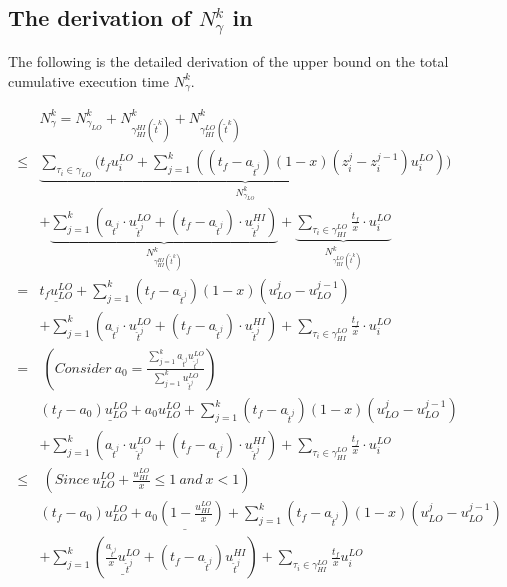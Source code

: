 \documentclass[10pt,journal,compsoc]{IEEEtran}
\begin{document}
\begin{appendices}
\section{The derivation of $N^{k}_{\gamma}$ in }
\label{appendix:I}
The following is the detailed derivation of the upper bound on the total cumulative execution time $N^{k}_{\gamma}$.
\begingroup
\allowdisplaybreaks
\begin{scriptsize}
\begin{align}
&N^{k}_{\gamma}=N^{k}_{\gamma_{LO}}+N^{k}_{\gamma_{HI}^{HI}(\hat{t}^{k})}+N^{k}_{\gamma_{HI}^{LO}(\hat{t}^{k})} \nonumber \\
\le{}&\underbrace{\sum_{\tau_i\in\gamma_{LO}}\bigg(t_fu_i^{LO}+\sum_{j=1}^{k}{((t_f-a_{\hat{t}^{j}})(1-x)(z_i^{j}-z_i^{j-1})u_i^{LO})}\bigg)}_{N^{k}_{\gamma_{LO}}}  \nonumber \\
&+\underbrace{\sum_{j=1}^{k}{(a_{\hat{t}^j}\cdot{}u_{\hat{t}^j}^{LO}+(t_f-a_{\hat{t}^j})\cdot{}u_{\hat{t}^j}^{HI})}}_{N^{k}_{\gamma_{HI}^{HI}(\hat{t}^{k})}} 
+\underbrace{\sum_{\tau_i\in\gamma_{HI}^{LO}}{\frac{t_f}{x}\cdot{}u_{i}^{LO}}}_{N^{k}_{\gamma_{HI}^{LO}(\hat{t}^{k})}} \nonumber \\
=&\underline{t_fu_{LO}^{LO}}+\sum_{j=1}^{k}{(t_f-a_{\hat{t}^{j}})(1-x)(u_{LO}^{j}-u_{LO}^{j-1})}\nonumber \\
&+\sum_{j=1}^{k}{(a_{\hat{t}^j}\cdot{}u_{\hat{t}^j}^{LO}+(t_f-a_{\hat{t}^j})\cdot{}u_{\hat{t}^j}^{HI})} 
+\sum_{\tau_i\in\gamma_{HI}^{LO}}{\frac{t_f}{x}\cdot{}u_{i}^{LO}} \nonumber \\
=&\ (Consider\ a_0=\frac{\sum_{j=1}^{k}{a_{\hat{t}^{j}}u_{\hat{t}^j}^{LO}}}{\sum_{j=1}^{k}{u_{\hat{t}^j}^{LO}}})   \nonumber \\
&\underline{(t_f-a_0)u_{LO}^{LO}+a_0u_{LO}^{LO}}+\sum_{j=1}^{k}{(t_f-a_{\hat{t}^{j}})(1-x)(u_{LO}^{j}-u_{LO}^{j-1})}\nonumber \\
&+\sum_{j=1}^{k}{(a_{\hat{t}^j}\cdot{}u_{\hat{t}^j}^{LO}+(t_f-a_{\hat{t}^j})\cdot{}u_{\hat{t}^j}^{HI})} 
+\sum_{\tau_i\in\gamma_{HI}^{LO}}{\frac{t_f}{x}\cdot{}u_{i}^{LO}} \nonumber \\
\le&\ (Since\ u_{LO}^{LO}+\frac{u_{HI}^{LO}}{x}\le{1}\ and\ x<1) \nonumber \\
&(t_f-a_0)u_{LO}^{LO}+\underline{a_0(1-\frac{u_{HI}^{LO}}{x})}+\sum_{j=1}^{k}{(t_f-a_{\hat{t}^{j}})(1-x)(u_{LO}^{j}-u_{LO}^{j-1})}\nonumber \\
&+\sum_{j=1}^{k}{(\underline{\frac{a_{\hat{t}^j}}{x}u_{\hat{t}^j}^{LO}}+(t_f-a_{\hat{t}^j})u_{\hat{t}^j}^{HI})} 
+\sum_{\tau_i\in\gamma_{HI}^{LO}}{\frac{t_f}{x}u_{i}^{LO}} \nonumber \\

\end{align}
\end{scriptsize}
\end{appendices}
\end{document}
